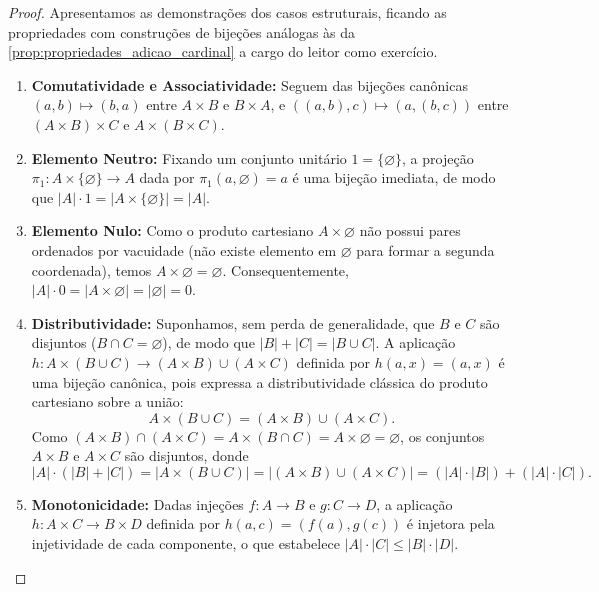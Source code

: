 \begin{proof}
    Apresentamos as demonstrações dos casos estruturais, ficando as propriedades com construções de bijeções análogas às da \autoref{prop:propriedades_adicao_cardinal} a cargo do leitor como exercício.
    \begin{enumerate}
        \item \textbf{Comutatividade e Associatividade:} Seguem das bijeções canônicas \((a, b) \mapsto (b, a)\) entre \(A \times B\) e \(B \times A\), e \(((a, b), c) \mapsto (a, (b, c))\) entre \((A \times B) \times C\) e \(A \times (B \times C)\).

        \item \textbf{Elemento Neutro:} Fixando um conjunto unitário \(1 = \{\varnothing\}\), a projeção \(\pi_1: A \times \{\varnothing\} \to A\) dada por \(\pi_1(a, \varnothing) = a\) é uma bijeção imediata, de modo que \(|A| \cdot 1 = |A \times \{\varnothing\}| = |A|\).

        \item \textbf{Elemento Nulo:} Como o produto cartesiano \(A \times \varnothing\) não possui pares ordenados por vacuidade (não existe elemento em \(\varnothing\) para formar a segunda coordenada), temos \(A \times \varnothing = \varnothing\). Consequentemente, \(|A| \cdot 0 = |A \times \varnothing| = |\varnothing| = 0\).

        \item \textbf{Distributividade:} Suponhamos, sem perda de generalidade, que \(B\) e \(C\) são disjuntos (\(B \cap C = \varnothing\)), de modo que \(|B| + |C| = |B \cup C|\). A aplicação \(h: A \times (B \cup C) \to (A \times B) \cup (A \times C)\) definida por \(h(a, x) = (a, x)\) é uma bijeção canônica, pois expressa a distributividade clássica do produto cartesiano sobre a união:
              \[
                  A \times (B \cup C) = (A \times B) \cup (A \times C).
              \]
              Como \((A \times B) \cap (A \times C) = A \times (B \cap C) = A \times \varnothing = \varnothing\), os conjuntos \(A \times B\) e \(A \times C\) são disjuntos, donde
              \[
                  |A| \cdot (|B| + |C|) = |A \times (B \cup C)| = |(A \times B) \cup (A \times C)| = (|A| \cdot |B|) + (|A| \cdot |C|).
              \]

        \item \textbf{Monotonicidade:} Dadas injeções \(f: A \to B\) e \(g: C \to D\), a aplicação \(h: A \times C \to B \times D\) definida por \(h(a, c) = (f(a), g(c))\) é injetora pela injetividade de cada componente, o que estabelece \(|A| \cdot |C| \leq |B| \cdot |D|\).
    \end{enumerate}
\end{proof}

